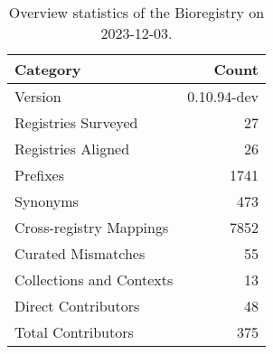 \begin{table}
\caption{Overview statistics of the Bioregistry on 2023-12-03.}
\label{tab:bioregistry-summary}
\begin{tabular}{lr}
\toprule
Category & Count \\
\midrule
Version & 0.10.94-dev \\
Registries Surveyed & 27 \\
Registries Aligned & 26 \\
Prefixes & 1741 \\
Synonyms & 473 \\
Cross-registry Mappings & 7852 \\
Curated Mismatches & 55 \\
Collections and Contexts & 13 \\
Direct Contributors & 48 \\
Total Contributors & 375 \\
\bottomrule
\end{tabular}
\end{table}
